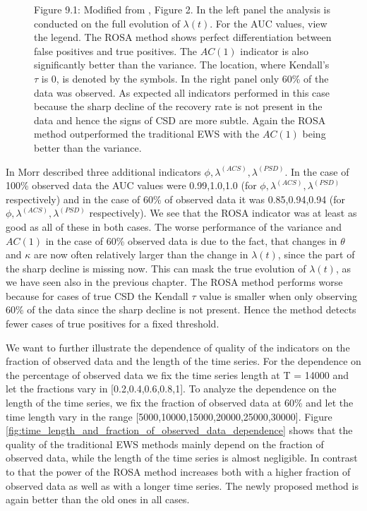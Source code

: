 \documentclass[%
thesis=student,%
coverpage=false,%
titlepage=false,%
headmarks=true, %
english,%
font=libertine, %
math=newpxtx, %
BCOR=5mm,%
coverBCOR=11mm%
]{tumbook}
\begin{document}
\begin{figure}[h!]
    \centering
    \begin{minipage}[b]{0.9\textwidth}
        \centering     
        Figure 9.1: Modified from \cite{Morr:2024}, Figure 2. In the left panel the analysis is conducted on the full evolution of $\lambda(t)$. For the AUC values, view the legend. The ROSA method shows perfect differentiation between false positives and true positives. The $AC(1)$ indicator is also significantly better than the variance. The location, where Kendall's $\tau$ is 0, is denoted by the symbols. In the right panel only 60\% of the data was observed. As expected all indicators performed in this case because the sharp decline of the recovery rate is not present in the data and hence the signs of CSD are more subtle. Again the ROSA method outperformed the traditional EWS with the $AC(1)$ being better than the variance.
    \end{minipage}
    \label{fig:ROC_curves}
\end{figure}

In \cite{Morr:2024} Morr described three additional indicators $\phi,\lambda^{(ACS)},\lambda^{(PSD)}$. In the case of 100\% observed data the AUC values were 0.99,1.0,1.0 (for $\phi,\lambda^{(ACS)},\lambda^{(PSD)}$ respectively) and in the case of 60\% of observed data it was 0.85,0.94,0.94 (for $\phi,\lambda^{(ACS)},\lambda^{(PSD)}$ respectively). We see that the ROSA indicator was at least as good as all of these in both cases.
The worse performance of the variance and $AC(1)$ in the case of 60\% observed data is due to the fact, that changes in $\theta$ and $\kappa$ are now often relatively larger than the change in $\lambda(t)$, since the part of the sharp decline is missing now. This can mask the true evolution of $\lambda(t)$, as we have seen also in the previous chapter. The ROSA method performs worse because for cases of true CSD the Kendall $\tau$ value is smaller when only observing 60\% of the data since the sharp decline is not present. Hence the method detects fewer cases of true positives for a fixed threshold.

We want to further illustrate the dependence of quality of the indicators on the fraction of observed data and the length of the time series. For the dependence on the percentage of observed data we fix the time series length at T = 14000 and let the fractions vary in [0.2,0.4,0.6,0.8,1]. To analyze the dependence on the length of the time series, we fix the fraction of observed data at 60\% and let the time length vary in the range [5000,10000,15000,20000,25000,30000]. Figure \ref{fig:time_length_and_fraction_of_observed_data_dependence} shows that the quality of the traditional EWS methods mainly depend on the fraction of observed data, while the length of the time series is almost negligible. In contrast to that the power of the ROSA method increases both with a higher fraction of observed data as well as with a longer time series. The newly proposed method is again better than the old ones in all cases. 
\end{document}
